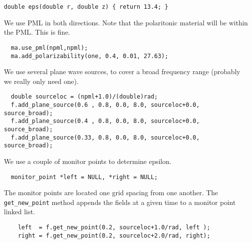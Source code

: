 \begin{verbatim}
double eps(double r, double z) { return 13.4; }
\end{verbatim}
\begin{comment}
double one(double r, double z) { return 1; }

int main(int argc, char **argv) {
  deal_with_ctrl_c();
  const double ttot = 600.0;
  mat ma(eps, rmax + npml/(double)rad, zsize, rad);
  const char *dirname = make_output_directory(argv[0]);
  printf("Storing output in directory %
  ma.set_output_directory(dirname);
\end{comment}
We use PML in both directions.  Note that the polaritonic material will be
within the PML.  This is fine.
\begin{verbatim}
  ma.use_pml(npml,npml);
  ma.add_polarizability(one, 0.4, 0.01, 27.63);
\end{verbatim}
\begin{comment}
  fields f(&ma, m);
\end{comment}
We use several plane wave sources, to cover a broad frequency range
(probably we really only need one).
\begin{verbatim}
  double sourceloc = (npml+1.0)/(double)rad;
  f.add_plane_source(0.6 , 0.8, 0.0, 8.0, sourceloc+0.0, source_broad);
  f.add_plane_source(0.4 , 0.8, 0.0, 8.0, sourceloc+0.0, source_broad);
  f.add_plane_source(0.33, 0.8, 0.0, 8.0, sourceloc+0.0, source_broad);
\end{verbatim}
\begin{comment}
  printf("Working on m = %
\end{comment}
We use a couple of monitor points to determine epsilon.
\begin{verbatim}
  monitor_point *left = NULL, *right = NULL;
\end{verbatim}
\begin{comment}
  double next_printtime = 50;
  while (f.time() < ttot && !interrupt) {
    if (f.time() >= next_printtime) {
      next_printtime += 50;
      printf("Working on time %
      printf("energy is %
    }
\end{comment}
The monitor points are located one grid spacing from one another.  The
\verb*|get_new_point| method appends the fields at a given time to a
monitor point linked list.
\begin{verbatim}
    left  = f.get_new_point(0.2, sourceloc+1.0/rad, left );
    right = f.get_new_point(0.2, sourceloc+2.0/rad, right);
\end{verbatim}
